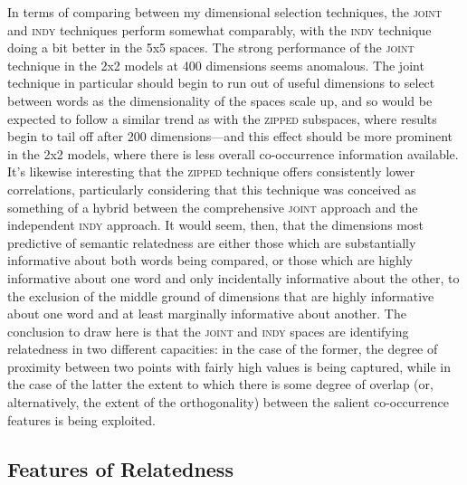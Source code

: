 In terms of comparing between my dimensional selection techniques, the \textsc{joint} and \textsc{indy} techniques perform somewhat comparably, with the \textsc{indy} technique doing a bit better in the 5x5 spaces.  The strong performance of the \textsc{joint} technique in the 2x2 models at 400 dimensions seems anomalous.  The joint technique in particular should begin to run out of useful dimensions to select between words as the dimensionality of the spaces scale up, and so would be expected to follow a similar trend as with the \textsc{zipped} subspaces, where results begin to tail off after 200 dimensions---and this effect should be more prominent in the 2x2 models, where there is less overall co-occurrence information available.  It's likewise interesting that the \textsc{zipped} technique offers consistently lower correlations, particularly considering that this technique was conceived as something of a hybrid between the comprehensive \textsc{joint} approach and the independent \textsc{indy} approach.  It would seem, then, that the dimensions most predictive of semantic relatedness are either those which are substantially informative about both words being compared, or those which are highly informative about one word and only incidentally informative about the other, to the exclusion of the middle ground of dimensions that are highly informative about one word and at least marginally informative about another.  The conclusion to draw here is that the \textsc{joint} and \textsc{indy} spaces are identifying relatedness in two different capacities: in the case of the former, the degree of proximity between two points with fairly high values is being captured, while in the case of the latter the extent to which there is some degree of overlap (or, alternatively, the extent of the orthogonality) between the salient co-occurrence features is being exploited.

\subsection{Features of Relatedness}

